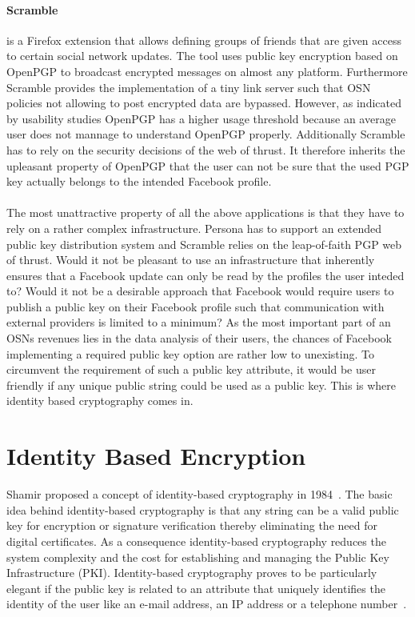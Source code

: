 \documentclass[journal]{IEEEtran}
\begin{document}
\paragraph{Scramble} is a Firefox extension that allows defining groups of
friends that are given access to certain social network updates. The tool uses
public key encryption based on OpenPGP \cite{rfc4880} to broadcast encrypted
messages on almost any platform. Furthermore Scramble provides the
implementation of a tiny link server such that OSN policies not allowing to post
encrypted data are bypassed. However, as indicated by usability studies
\cite{WhittenJohnny} OpenPGP has a higher usage threshold because an average
user does not mannage to understand OpenPGP properly. Additionally Scramble has
to rely on the security decisions of the web of thrust. It therefore inherits
the upleasant property of OpenPGP that the user can not be sure that the used
PGP key actually belongs to the intended Facebook profile.\cite{BeatoScramble}\\
\\
The most unattractive property of all the above applications is that they have
to rely on a rather complex infrastructure. Persona has to support an extended
public key distribution system and Scramble relies on the leap-of-faith PGP web
of thrust. Would it not be pleasant to use an infrastructure that inherently
ensures that a Facebook update can only be read by the profiles the user
inteded to? Would it not be a desirable approach that Facebook would require
users to publish a public key on their Facebook profile such that communication
with external providers is limited to a minimum? As the most important part of
an OSNs revenues lies in the data analysis of their users, the chances of
Facebook implementing a required public key option are rather low to
unexisting. To circumvent the requirement of such a public key attribute, it
would be user friendly if any unique public string could be used as a public
key. This is where identity based cryptography comes in.


\section{Identity Based Encryption}
Shamir proposed a concept of identity-based cryptography in
1984~\cite{DBLP:conf/crypto/Shamir84}. The basic idea behind identity-based
cryptography is that any string can be a valid public key for encryption or
signature verification thereby eliminating the need for digital certificates.
As a consequence identity-based cryptography reduces the system
complexity and the cost for establishing and managing the Public
Key Infrastructure (PKI). Identity-based cryptography proves to be particularly
elegant if the public key is related to an attribute that uniquely identifies
the identity of the user like an e-mail address, an IP address or a telephone
number~\cite{Baek04asurvey}.
\end{document}
